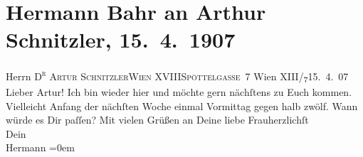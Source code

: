 

         
         \renewcommand{\erwaehntePersonen}{Personen: Hermann Bahr, Olga Schnitzler}
         \renewcommand{\erwaehnteOrte}{Orte: Edmund-Weiß-Gasse 7, Ober Sankt Veit, Wien, XIII., Hietzing, XVIII., Währing}
         \renewcommand{\erwaehnteWerke}{}
               \section[Hermann Bahr an Arthur Schnitzler, 15. 4. 1907]{ Hermann Bahr an Arthur Schnitzler, 15. 4. 1907}\nopagebreak{}\rehead{ }\begin{ledgroupsized}[t]{13cm}\normalsize\beginnumbering \toendnotes[C]{\smallbreak\pagebreak[2]} 
\toendnotes[C]{\smallbreak}\pstart{}{\pb}Herrn \textsc{D\textsuperscript{r} Artur Schnitzler}\pend{}\pstart{}\textsc{Wien XVIII}\pend{}\pstart{}\textsc{Spöttelgasse 7}\pend{}{\bigskip}\pstart
           \raggedleft{}{\pb}Wien XIII/\textsubscript{7}15. 4. 07\pend
           \pstart{}Lieber Artur!\pend\pstart
           Ich bin wieder hier und möchte gern nächſtens zu Euch kommen. Vielleicht Anfang der
               nächſten Woche einmal Vormittag gegen halb zwölf. Wann würde es Dir paſſen?\pend
           \pstart
           Mit vielen Grüßen an Deine liebe Frauherzlichſt{\\[\baselineskip]}Dein{\\[\baselineskip]}\spacefill\mbox{Hermann}\pend
           \leftskip=0em{}
         
         \endnumbering{}\end{ledgroupsized}  \newcommand{\dateiname}{L01668}\newcommand{\titel}{Hermann Bahr an Arthur Schnitzler, 15. 4. 1907}\newcommand{\editorInnen}{ Kurt Ifkovits,  Martin Anton Müller}
      